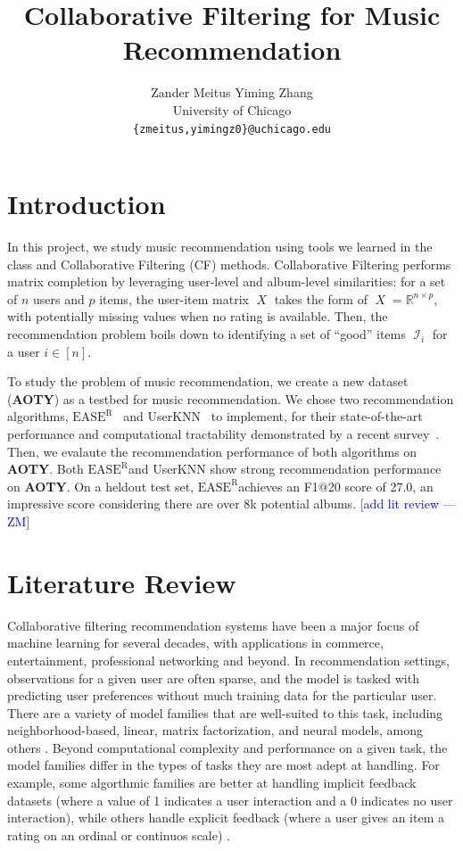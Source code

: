 \documentclass{article}
\title{Collaborative Filtering for Music Recommendation}
\author{
  Zander Meitus \qquad Yiming Zhang \\
  University of Chicago \\
  \texttt{\{zmeitus,yimingz0\}@uchicago.edu}
}
\newcommand{\aoty}{{\bf AOTY}\xspace}
\DeclareMathOperator{\X}{\mathit{X}}
\DeclareMathOperator{\I}{\mathcal{I}}
\newcommand{\easer}{$\text{EASE}^\text{R}$}
\newcommand{\userknn}{UserKNN\xspace}
\newcommand{\zander}[1]{\textcolor{blue}{[#1 ---\textsc{ZM}]}}
\begin{document}
\maketitle

\section{Introduction}

In this project, we study music recommendation using tools we learned in the
 class and Collaborative Filtering (CF) methods.
Collaborative Filtering performs matrix completion by leveraging user-level and
 album-level similarities: for a set of $n$ users and $p$ items, the user-item
 matrix $\X$ takes the form of $\X = \mathbb{R}^{n \times p}$, with potentially
 missing values when no rating is available.
Then, the recommendation problem boils down to identifying a set of ``good''
 items $\I_i$ for a user $i \in [n]$.

To study the problem of music recommendation, we create a new dataset (\aoty)
 as a testbed for music recommendation.
We chose two recommendation algorithms,
 \easer~\citep{steckEmbarrassinglyShallowAutoencoders2019} and
 \userknn~\citep{resnickGroupLensOpenArchitecture1994} to implement, for their
 state-of-the-art performance and computational tractability demonstrated by a
 recent survey~\citep{anelliTopNRecommendationAlgorithms2022}.
Then, we evalaute the recommendation performance of both algorithms on \aoty.
Both \easer and \userknn show strong recommendation performance on \aoty.
On a heldout test set, \easer achieves an F1@20 score of 27.0, an impressive
 score considering there are over 8k potential albums.
\zander{add lit review}
\section{Literature Review}
Collaborative filtering recommendation systems have been a major focus of machine learning
for several decades, with applications in commerce, entertainment, professional networking and beyond.
In recommendation settings, observations for a given user are often sparse, and the model
is tasked with predicting user preferences without much training data for the particular
user. 
There are a variety of model families that are well-suited to this task, including neighborhood-based, 
linear, matrix factorization, and neural models, among others \citep{anelliTopNRecommendationAlgorithms2022}. 
Beyond computational complexity and performance on a given task, the model families differ
in the types of tasks they are most adept at handling. For example, some algorthmic families
are better at handling implicit feedback datasets (where a value of 1 indicates a user
interaction and a 0 indicates no user interaction), while others handle explicit feedback
(where a user gives an item a rating on an ordinal or continuos scale) \citep{steckEmbarrassinglyShallowAutoencoders2019}.
\end{document}
